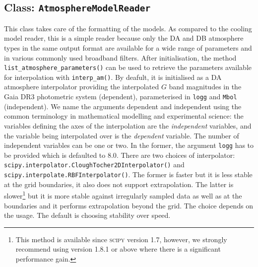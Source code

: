 \documentclass[fleqn,usenatbib]{rasti}
\begin{document}
\subsection{Class: \texttt{AtmosphereModelReader}}
This class takes care of the formatting of the models. As compared to the
cooling model reader, this is a simple reader because only the DA and DB
atmosphere types in the same output format are available for a wide range of
parameters and in various commonly used broadband filters. After initialisation,
the method \verb+list_atmosphere_parameters()+ can be used to retrieve the
parameters available for interpolation with \verb+interp_am()+. By deafult, it
is initialised as a DA atmosphere interpolator providing the interpolated $G$
band magnitudes in the Gaia DR3 photometric system (dependent), parameterised
in \verb+logg+ and \verb+Mbol+ (independent). We name the arguments dependent
and independent using the common terminology in mathematical modelling and
experimental science: the variables defining the axes of the interpolation are
the \textit{independent} variables, and the variable being interpolated over
is the \textit{dependent} variable. The number of independent variables can be
one or two. In the former, the argument \verb+logg+ has to be provided which
is defaulted to $8.0$. There are two choices of interpolator:
\verb+scipy.interpolator.CloughTocher2DInterpolator()+ and 
\verb+scipy.interpolate.RBFInterpolator()+. The former is faster but it is less
stable at the grid boundaries, it also does not support extrapolation. The
latter is slower\footnote{This method is available since \textsc{scipy}
version 1.7, however, we strongly recommend using version 1.8.1 or above where
there is a significant performance gain.} but it is more stable against
irregularly sampled data as well as at the boundaries and it performs
extrapolation beyond the grid. The choice depends on the usage. The default
is choosing stability over speed.
\end{document}
